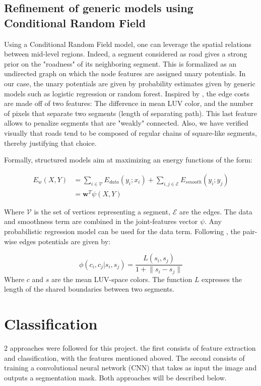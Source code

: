 \documentclass[10pt,conference,compsocconf]{IEEEtran}
\begin{document}
	\subsection{Refinement of generic models using Conditional Random Field}
	\label{refinement}
	Using a Conditional Random Field model, one can leverage the spatial relations between mid-level regions. Indeed, a segment considered as road gives a strong prior on the "roadness" of its neighboring segment. This is formalized as an undirected graph on which the node features are assigned unary potentials. In our case, the unary potentials are given by probability estimates given by generic models such as logistic regression or random forest.
	Inspired by \cite{fulkerson09}, the edge costs are made off of two features: The difference in mean LUV color, and the number of pixels that separate two segments (length of separating path). This last feature allows to penalize segments that are "weakly" connected. Also, we have verified visually that roads tend to be composed of regular chains of square-like segments, thereby justifying that choice.
	
	Formally, structured models aim at maximizing an energy functions of the form:
	
	\begin{equation}
	\begin{split}
	E_w(X,Y) &= \sum_{i \in \mathcal{V}} E_{data}(y_i;x_i) + \sum_{i,j \in \mathcal{E}} E_{smooth}(y_i;y_j) \\
	&= \mathbf{w}^T \psi(X,Y)
	\end{split}
	\end{equation}
	
	Where \(\mathcal{V}\) is the set of vertices representing a segment, \(\mathcal{E}\) are the edges. The data and smoothness term are combined in the joint-features vector \(\psi\). Any probabilistic regression model can be used for the data term. Following \cite{fulkerson09}, the pair-wise edges potentials are given by:
	
	\begin{equation}
	\phi(c_i,c_j|s_i,s_j) = \frac{L(s_i,s_j)}{1+\lVert s_i - s_j \rVert}
	\end{equation}
	Where \(c\) and \(s\) are the mean LUV-space colors. The function \(L\) expresses the length of the shared boundaries between two segments.
	\section{Classification}
	2 approaches were followed for this project. the first consists of feature extraction and classification, with the features mentioned aboved. The second consists of training a convolutional neural network (CNN) that takes as input the image and outputs a segmentation mask. Both approaches will be described below. 	
	
\end{document}
